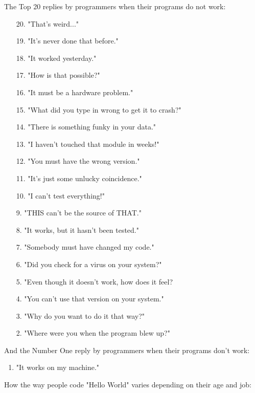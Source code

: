 The Top 20 replies by programmers when their programs do not work:
	\begin{enumerate}[nolistsep]
		\item[20.] "That's weird..."
		\item[19.] "It's never done that before."
		\item[18.] "It worked yesterday."
		\item[17.] "How is that possible?"
		\item[16.] "It must be a hardware problem."
		\item[15.] "What did you type in wrong to get it to crash?"
		\item[14.] "There is something funky in your data."
		\item[13.] "I haven't touched that module in weeks!"
		\item[12.] "You must have the wrong version."
		\item[11.] "It's just some unlucky coincidence."
		\item[10.] "I can't test everything!"
		\item[9.] "THIS can't be the source of THAT."
		\item[8.] "It works, but it hasn't been tested."
		\item[7.] "Somebody must have changed my code."
		\item[6.] "Did you check for a virus on your system?"
		\item[5.] "Even though it doesn't work, how does it feel?
		\item[4.] "You can't use that version on your system."
		\item[3.] "Why do you want to do it that way?"
		\item[2.] "Where were you when the program blew up?"
	\end{enumerate}

And the Number One reply by programmers when their programs don't work:
	\begin{enumerate}
		\item "It works on my machine."		
	\end{enumerate}


\begin{center}\underline{\hspace{5 cm}}\end{center}	

How the way people code "Hello World" varies depending on their age and job:

